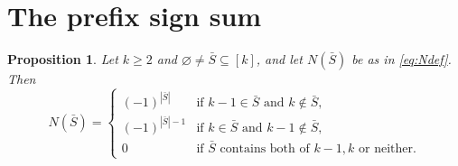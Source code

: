 \documentclass[11pt]{article}
\newtheorem{proposition}[theorem]{Proposition}
\theoremstyle{definition}
\begin{document}
\section{The prefix sign sum}

\begin{proposition}\label{prop:N}
Let $k\ge2$ and $\varnothing\ne\bar S\subseteq[k]$, and let $N(\bar S)$ be as in
\eqref{eq:Ndef}.  Then
\[
  N(\bar S)=\begin{cases}
    (-1)^{|\bar S|}   & \text{if }k-1\in\bar S\text{ and }k\notin\bar S,\\[2pt]
    (-1)^{|\bar S|-1} & \text{if }k\in\bar S\text{ and }k-1\notin\bar S,\\[2pt]
    0 & \text{if $\bar S$ contains both of $k-1,k$ or neither.}
  \end{cases}
\]
\end{proposition}
\end{document}
